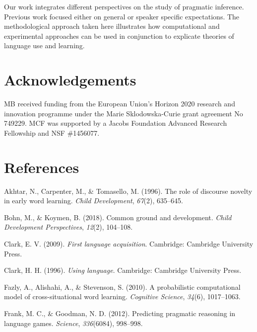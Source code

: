 \documentclass[10pt, letterpaper]{article}
\begin{document}
Our work integrates different perspectives on the study of pragmatic
inference. Previous work focused either on general or speaker specific
expectations. The methodological approach taken here illustrates how
computational and experimental approaches can be used in conjunction to
explicate theories of language use and learning.

\vspace{1em}
\vspace{1em}

\section{Acknowledgements}\label{acknowledgements}

MB received funding from the European Union's Horizon 2020 research and
innovation programme under the Marie Sklodowska-Curie grant agreement No
749229. MCF was supported by a Jacobs Foundation Advanced Research
Fellowship and NSF \#1456077.

\section{References}\label{references}

\setlength{\parindent}{-0.1in} \setlength{\leftskip}{0.125in} \noindent

\hypertarget{refs}{}
\hypertarget{ref-akhtar1996role}{}
Akhtar, N., Carpenter, M., \& Tomasello, M. (1996). The role of
discourse novelty in early word learning. \emph{Child Development},
\emph{67}(2), 635--645.

\hypertarget{ref-bohn2018common}{}
Bohn, M., \& Koymen, B. (2018). Common ground and development.
\emph{Child Development Perspectives}, \emph{12}(2), 104--108.

\hypertarget{ref-clark2009first}{}
Clark, E. V. (2009). \emph{First language acquisition}. Cambridge:
Cambridge University Press.

\hypertarget{ref-clark1996using}{}
Clark, H. H. (1996). \emph{Using language}. Cambridge: Cambridge
University Press.

\hypertarget{ref-fazly2010probabilistic}{}
Fazly, A., Alishahi, A., \& Stevenson, S. (2010). A probabilistic
computational model of cross-situational word learning. \emph{Cognitive
Science}, \emph{34}(6), 1017--1063.

\hypertarget{ref-frank2012predicting}{}
Frank, M. C., \& Goodman, N. D. (2012). Predicting pragmatic reasoning
in language games. \emph{Science}, \emph{336}(6084), 998--998.
\end{document}
